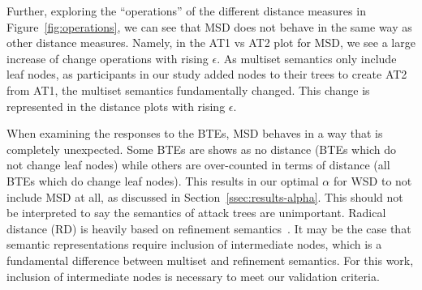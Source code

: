 Further, exploring the ``operations'' of the different distance measures in Figure~\ref{fig:operations}, we can see that MSD does not behave in the same way as other distance measures. Namely, in the AT1 vs AT2 plot for MSD, we see a large increase of change operations with rising $\epsilon$. As multiset semantics only include leaf nodes, as participants in our study added nodes to their trees to create AT2 from AT1, the multiset semantics fundamentally changed. This change is represented in the distance plots with rising $\epsilon$.

When examining the responses to the BTEs, MSD behaves in a way that is completely unexpected. Some BTEs are shows as no distance (BTEs which do not change leaf nodes) while others are over-counted in terms of distance (all BTEs which do change leaf nodes). This results in our optimal $\alpha$ for WSD to not include MSD at all, as discussed in Section~\ref{ssec:results-alpha}. This should not be interpreted to say the semantics of attack trees are unimportant. Radical distance (RD) is heavily based on refinement semantics~\cite{gadyatskayaRefinementAwareGenerationAttack2017}. It may be the case that semantic representations require inclusion of intermediate nodes, which is a fundamental difference between multiset and refinement semantics. For this work, inclusion of intermediate nodes is necessary to meet our validation criteria.






